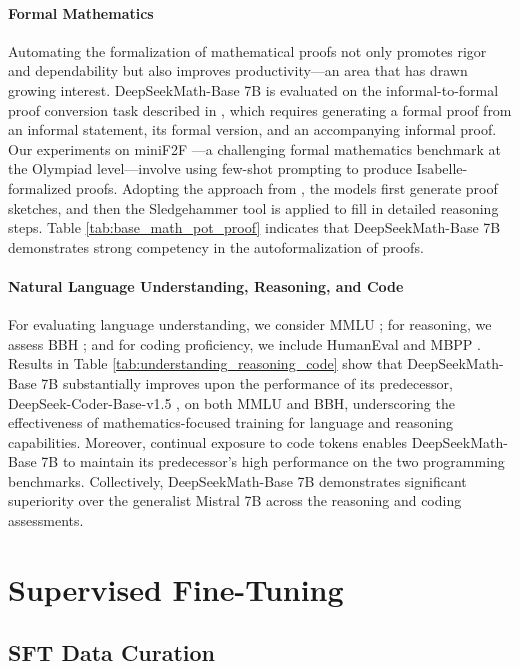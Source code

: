 \paragraph{Formal Mathematics}

Automating the formalization of mathematical proofs not only promotes rigor and dependability but also improves productivity—an area that has drawn growing interest. DeepSeekMath-Base 7B is evaluated on the informal-to-formal proof conversion task described in \citep{dsp_proof}, which requires generating a formal proof from an informal statement, its formal version, and an accompanying informal proof. Our experiments on miniF2F \citep{minif2f}—a challenging formal mathematics benchmark at the Olympiad level—involve using few-shot prompting to produce Isabelle-formalized proofs. Adopting the approach from \cite{dsp_proof}, the models first generate proof sketches, and then the Sledgehammer tool \citep{sledgehammer} is applied to fill in detailed reasoning steps. Table \ref{tab:base_math_pot_proof} indicates that DeepSeekMath-Base 7B demonstrates strong competency in the autoformalization of proofs.

\paragraph{Natural Language Understanding, Reasoning, and Code}

For evaluating language understanding, we consider MMLU \citep{mmlu}; for reasoning, we assess BBH \citep{bbh}; and for coding proficiency, we include HumanEval \citep{codex} and MBPP \citep{mbpp}. Results in Table \ref{tab:understanding_reasoning_code} show that DeepSeekMath-Base 7B substantially improves upon the performance of its predecessor, DeepSeek-Coder-Base-v1.5 \citep{deepseek-coder}, on both MMLU and BBH, underscoring the effectiveness of mathematics-focused training for language and reasoning capabilities. Moreover, continual exposure to code tokens enables DeepSeekMath-Base 7B to maintain its predecessor’s high performance on the two programming benchmarks. Collectively, DeepSeekMath-Base 7B demonstrates significant superiority over the generalist Mistral 7B \citep{mistral} across the reasoning and coding assessments.

\section{Supervised Fine-Tuning}

\subsection{SFT Data Curation}


